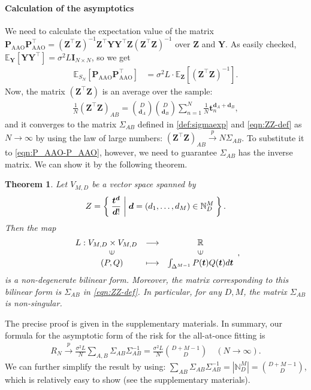 \documentclass[letterpaper]{article} %
\theoremstyle{plain}
\newtheorem{theorem}{Theorem}
\newcommand{\card}[1]{\left| #1 \right|}
\newcommand{\paren}[1]{\left( #1 \right)}
\newcommand{\sqbra}[1]{\left[#1 \right]}
\newcommand{\R}{\mathbb{R}}
\newcommand{\N}{\mathbb{N}}
\newcommand{\E}{\mathbb{E}}
\newcommand{\ZZ}{\Sigma}
\begin{document}
\paragraph{Calculation of the asymptotics}
We need to calculate the expectation value of the matrix $\bm P_\mathrm{AAO} \bm P_\mathrm{AAO}^\top = \paren{\bm Z^\top \bm Z}^{-1}\bm Z^\top \bm Y \bm Y^\top \bm Z \paren{\bm Z^\top \bm Z}^{-1}$ over $\bm Z$ and $\bm Y$.
As easily checked, $\E_{\bm Y}[\bm Y \bm Y^\top] = \sigma^2 L \bm I_{N \times N}$, so we get
\begin{align}
    \E_{S_N} \sqbra{\bm P_\mathrm{AAO} \bm P_\mathrm{AAO}^\top}
    &=
    \sigma^2 L \cdot \E_{\bm Z} \sqbra{\paren{\bm Z^\top \bm Z}^{-1}}
    .
    \label{eqn:P_AAO-P_AAO}
\end{align}
Now, the matrix $(\bm Z^\top \bm Z)$ is an average over the sample:
\begin{align}
    \frac{1}{N}
    \paren{\bm Z^\top \bm Z}_{AB}
    =
    \binom{D}{\bm d_A}
    \binom{D}{\bm d_B}
    \sum_{n = 1}^N
    \frac{1}{N}
    \bm t_n^{\bm d_A + \bm d_B}
    ,
\end{align}
and it converges to the matrix $\ZZ_{AB} $ defined in \cref{def:sigmaexp} and \cref{eqn:ZZ-def} as $N \to \infty$ by using the law of large numbers: $\paren{\bm Z^\top \bm Z}_{AB} \overset{p}{\to} N \ZZ_{AB}$.
To substitute it to \cref{eqn:P_AAO-P_AAO}, however, we need to guarantee $\ZZ_{AB}$ has the inverse matrix.
We can show it by the following theorem.
\begin{theorem}\label{thm:sigma-is-non-singular}
Let $V_{M, D}$ be a vector space spanned by
\[
    Z = \Set{\frac{\bm{t}^{\bm{d}}}{\bm{d}!} | \bm{d} = (d_1, \dots, d_M) \in \N^M_D}.
\]
Then the map
\[
    \begin{array}{ccc}
    L:V_{M, D} \times V_{M, D} & \longrightarrow & \R\\
    \ \ \ \  \rotatebox{90}{$\in$}    &                 & \rotatebox{90}{$\in$} \\
    \ \ \ \  (P, Q)                   & \longmapsto     & \int_{\Delta^{M - 1}} P(\bm{t}) Q(\bm{t}) d\bm{t}
    \end{array},
\]
is a non-degenerate bilinear form.
Moreover, the matrix corresponding to this bilinear form is $\Sigma_{AB}$ in \cref{eqn:ZZ-def}.
In particular, for any $D, M$, the matrix $\ZZ_{AB}$ is non-singular.
\end{theorem}
The precise proof is given in the supplementary materials. %
In summary, our formula for the asymptotic form of the risk for the all-at-once fitting is
\begin{align*}
    R_N
    \overset{p}{\to}
    \frac{\sigma^2 L}{N} \sum_{A, B} \ZZ_{AB} \ZZ^{-1}_{AB}
    =
    \frac{\sigma^2 L}{N} \binom{D + M - 1}{D} \quad (N \to \infty).
\end{align*}
We can further simplify the result by using: $\sum_{AB} \ZZ_{AB} \ZZ^{-1}_{AB} = \card{\N_D^M} = \binom{D + M - 1}{D}$, which is relatively easy to show (see the supplementary materials).
\end{document}
